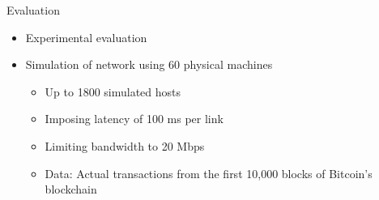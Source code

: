 \begin{frame}{Evaluation}
    \begin{itemize}
        \item Experimental evaluation
        \item Simulation of network using 60 physical machines
            \begin{itemize}
                \item Up to 1800 simulated hosts
                \item Imposing latency of 100 ms per link
                \item Limiting bandwidth to 20 Mbps
                \item Data: Actual transactions from the first 10,000 blocks of Bitcoin's blockchain
            \end{itemize}
    \end{itemize}
\end{frame}
\note{
    \begin{itemize}
        \item
    \end{itemize}
}

